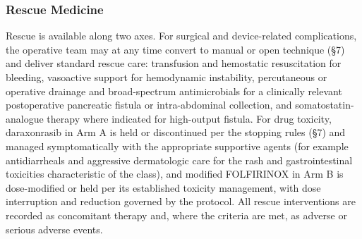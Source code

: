 \subsubsection{Rescue Medicine}

Rescue is available along two axes. For surgical and device-related complications,
the operative team may at any time convert to manual or open technique (\S7) and
deliver standard rescue care: transfusion and hemostatic resuscitation for bleeding,
vasoactive support for hemodynamic instability, percutaneous or operative drainage and
broad-spectrum antimicrobials for a clinically relevant postoperative pancreatic
fistula or intra-abdominal collection, and somatostatin-analogue therapy where
indicated for high-output fistula. For drug toxicity, daraxonrasib in Arm A is held or
discontinued per the stopping rules (\S7) and managed symptomatically with the
appropriate supportive agents (for example antidiarrheals and aggressive dermatologic
care for the rash and gastrointestinal toxicities characteristic of the class), and
modified FOLFIRINOX in Arm B is dose-modified or held per its established toxicity
management, with dose interruption and reduction governed by the protocol. All rescue
interventions are recorded as concomitant therapy and, where the criteria are met, as
adverse or serious adverse events.
